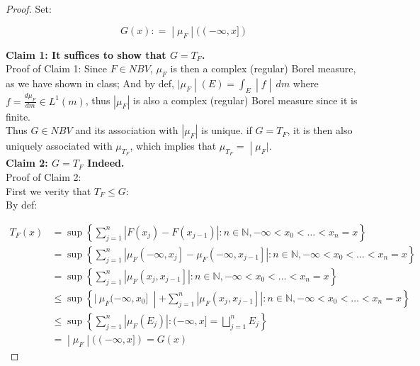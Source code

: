 \begin{proof}

Set:

\[\left. G(x): = \middle| \mu_{F} \middle| (( - \infty,x\rbrack) \right.\]

\textbf{Claim 1: It suffices to show that \(G = T_{F}\).}\\
Proof of Claim 1: Since \(F \in NBV\), \(\mu_{F}\) is then a complex (regular) Borel measure, as we have shown in class; And by def, \(\left. |\mu_{F} \middle| (E) = \int_{E} \middle| f \middle| \, dm \right.\) where \(f = \frac{d\mu_{F}}{dm} \in L^{1}(m)\), thus \(|\mu_{F}|\) is also a complex (regular) Borel measure since it is finite.\\
Thus \(G \in NBV\) and its association with \(|\mu_{F}|\) is unique. if \(G = T_{F}\), it is then also uniquely associated with \(\mu_{T_{F}}\), which implies that \(\left. \mu_{T_{F}} = \middle| \mu_{F}| \right.\).\\
\textbf{Claim 2: \(G = T_{F}\) Indeed.}\\
Proof of Claim 2:\\
First we verity that \(T_{F} \leq G\):\\
By def:

\[\begin{matrix}
{T_{F}(x)} & {= \sup\left\{ {\sum\limits_{j = 1}^{n}\left| {F\left( x_{j} \right) - F\left( x_{j - 1} \right)} \right|:n \in \mathbb{N}, - \infty < x_{0} < \ldots < x_{n} = x} \right\}} \\
 & {= \sup\left\{ {\sum\limits_{j = 1}^{n}\left| {\mu_{F}\left( {- \infty,x_{j}} \right\rbrack - \mu_{F}\left( {- \infty,x_{j - 1}} \right\rbrack} \right|:n \in \mathbb{N}, - \infty < x_{0} < \ldots < x_{n} = x} \right\}} \\
 & {= \sup\left\{ {\sum\limits_{j = 1}^{n}\left| {\mu_{F}\left( {x_{j},x_{j - 1}} \right\rbrack} \right|:n \in \mathbb{N}, - \infty < x_{0} < \ldots < x_{n} = x} \right\}} \\
 & {\leq \sup\left\{ |\ \mu_{F}( - \infty,x_{0}\rbrack\  \middle| + \sum\limits_{j = 1}^{n}\left| {\mu_{F}\left( {x_{j},x_{j - 1}} \right\rbrack} \right|:n \in \mathbb{N}, - \infty < x_{0} < \ldots < x_{n} = x \right\}} \\
 & {\leq \sup\left\{ {\sum\limits_{j = 1}^{n}\left| {\mu_{F}\left( E_{j} \right)} \right|:( - \infty,x\rbrack = \bigsqcup\limits_{j = 1}^{n}E_{j}} \right\}} \\
 & \left. = \middle| \mu_{F} \middle| (( - \infty,x\rbrack) = G(x) \right.
\end{matrix}\]


\end{proof}
